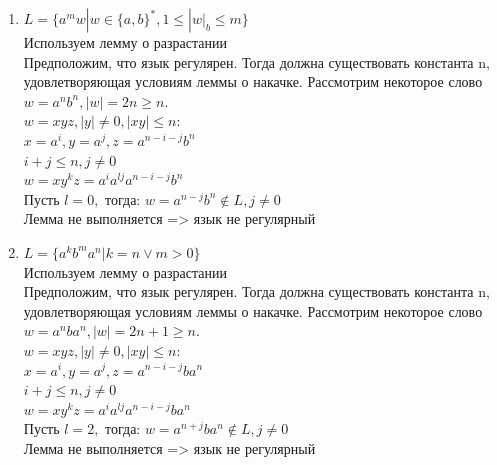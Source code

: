 \documentclass[a4paper]{article}
\begin{document}
\begin{enumerate}
\item $L = \{ a^mw  | w \in \{a,b\}^* , 1 \le |w|_b \le m   \} $
\\ Используем лемму о разрастании\\
Предположим, что язык регулярен. Тогда должна существовать константа n, удовлетворяющая условиям леммы о накачке. Рассмотрим некоторое слово
$w = a^nb^n, |w| = 2n \ge n.$\\
$w = xyz, |y| \ne 0, |xy| \le n:$\\
$x = a^i, y = a^j, z = a^{n-i-j}b^n$\\
$i + j \le n, j \ne 0 $\\
$w = xy^kz=a^ia^{lj}a^{n-i-j}b^n$\\
Пусть $l=0,$ тогда: $w = a^{n-j}b^n \notin L  ,j \ne 0$\\
Лемма не выполняется => язык не регулярный\\

\item $L = \{ a^kb^ma^n  | k = n \vee m > 0  \} $
\\ Используем лемму о разрастании\\
Предположим, что язык регулярен. Тогда должна существовать константа n, удовлетворяющая условиям леммы о накачке. Рассмотрим некоторое слово
$w = a^nba^n, |w| = 2n+1 \ge n.$\\
$w = xyz, |y| \ne 0, |xy| \le n:$\\
$x = a^i, y = a^j, z = a^{n-i-j}ba^n$\\
$i + j \le n, j \ne 0 $\\
$w = xy^kz=a^ia^{lj}a^{n-i-j}ba^n$\\
Пусть $l=2,$ тогда: $w = a^{n+j}ba^n \notin L  ,j \ne 0$\\
Лемма не выполняется => язык не регулярный\\



\end{enumerate}
\end{document}
